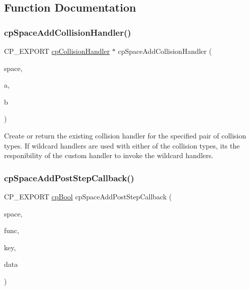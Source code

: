 \subsection{Function Documentation}
\mbox{\label{group__cpSpace_ga65edd7f02956f072b87daf7b42e61cf2}} 
\subsubsection{\texorpdfstring{cp\+Space\+Add\+Collision\+Handler()}{cpSpaceAddCollisionHandler()}}
{\footnotesize\ttfamily C\+P\+\_\+\+E\+X\+P\+O\+RT \hyperlink{structcpCollisionHandler}{cp\+Collision\+Handler} $\ast$ cp\+Space\+Add\+Collision\+Handler (\begin{DoxyParamCaption}\item[{\hyperlink{structcpSpace}{cp\+Space} $\ast$}]{space,  }\item[{\hyperlink{group__basicTypes_gae83e2f50965eb441e36ffff1e32e6d02}{cp\+Collision\+Type}}]{a,  }\item[{\hyperlink{group__basicTypes_gae83e2f50965eb441e36ffff1e32e6d02}{cp\+Collision\+Type}}]{b }\end{DoxyParamCaption})}

Create or return the existing collision handler for the specified pair of collision types. If wildcard handlers are used with either of the collision types, it\textquotesingle{}s the responibility of the custom handler to invoke the wildcard handlers. \mbox{\label{group__cpSpace_ga6fbf3c0722a5618ded1ed7371cbebcb3}} 
\subsubsection{\texorpdfstring{cp\+Space\+Add\+Post\+Step\+Callback()}{cpSpaceAddPostStepCallback()}}
{\footnotesize\ttfamily C\+P\+\_\+\+E\+X\+P\+O\+RT \hyperlink{group__basicTypes_gabc5e752c48f3449ca26ef413ecbd647e}{cp\+Bool} cp\+Space\+Add\+Post\+Step\+Callback (\begin{DoxyParamCaption}\item[{\hyperlink{structcpSpace}{cp\+Space} $\ast$}]{space,  }\item[{\hyperlink{group__cpSpace_ga93e9005e387fec86eeb4a225ac295a23}{cp\+Post\+Step\+Func}}]{func,  }\item[{void $\ast$}]{key,  }\item[{void $\ast$}]{data }\end{DoxyParamCaption})}

